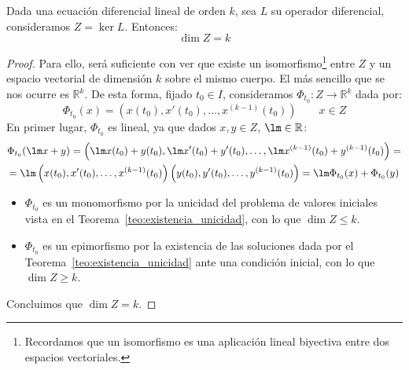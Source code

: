\begin{teo}
    Dada una ecuación diferencial lineal de orden $k$, sea $L$ su operador diferencial, consideramos $Z = \ker L$. Entonces:
    \begin{equation*}
        \dim Z = k
    \end{equation*}
    \begin{proof}
        Para ello, será suficiente con ver que existe un isomorfismo\footnote{Recordamos que un isomorfismo es una aplicación lineal biyectiva entre dos espacios vectoriales.} entre $Z$ y un espacio vectorial de dimensión $k$ sobre el mismo cuerpo. El más sencillo que se nos ocurre es $\mathbb{R}^k$. De esta forma, fijado $t_0\in I$, consideramos $\Phi_{t_0}:Z\rightarrow \mathbb{R}^k$ dada por:
        \begin{equation*}
            \Phi_{t_0}(x) = \left(x(t_0), x'(t_0), \ldots, x^{(k-1)}(t_0)\right) \qquad x\in Z
        \end{equation*}
        En primer lugar, $\Phi_{t_0}$ es lineal, ya que dados $x,y\in Z$, $\lm \in \mathbb{R}$:
        \begin{multline*}
            \Phi_{t_0}(\lm x+y) = \left(\lm x(t_0) + y(t_0), \lm x'(t_0) + y'(t_0), \ldots, \lm x^{(k-1)}(t_0) + y^{(k-1)}(t_0)\right) = \\
            =\lm \left(x(t_0), x'(t_0), \ldots, x^{(k-1)}(t_0)\right)\left(y(t_0), y'(t_0), \ldots, y^{(k-1)}(t_0)\right) = \lm \Phi_{t_0}(x) + \Phi_{t_0}(y)
        \end{multline*}

        \begin{itemize}
            \item $\Phi_{t_0}$ es un monomorfismo por la unicidad del problema de valores iniciales vista en el Teorema~\ref{teo:existencia_unicidad}, con lo que $\dim Z \leq k$.
            \item $\Phi_{t_0}$ es un epimorfismo por la existencia de las soluciones dada por el Teorema~\ref{teo:existencia_unicidad} ante una condición inicial, con lo que $\dim Z \geq k$.
        \end{itemize}
        Concluimos que $\dim Z = k$.
    \end{proof}
\end{teo}


